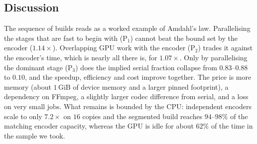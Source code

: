 \documentclass[conference]{IEEEtran}
\begin{document}
\subsection{Discussion}
The sequence of builds reads as a worked example of Amdahl's law. Parallelising the stages that are fast to begin with (P$_1$) cannot beat the bound set by the encoder ($1.14\times$). Overlapping GPU work with the encoder (P$_2$) trades it against the encoder's time, which is nearly all there is, for $1.07\times$. Only by parallelising the dominant stage (P$_3$) does the implied serial fraction collapse from $0.83$--$0.88$ to $0.10$, and the speedup, efficiency and cost improve together. The price is more memory (about $1$\,GiB of device memory and a larger pinned footprint), a dependency on FFmpeg, a slightly larger codec difference from serial, and a loss on very small jobs. What remains is bounded by the CPU: independent encoders scale to only $7.2\times$ on $16$ copies and the segmented build reaches $94$--$98\%$ of the matching encoder capacity, whereas the GPU is idle for about $62\%$ of the time in the sample we took.

\end{document}

